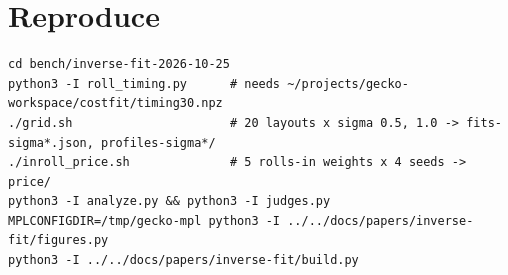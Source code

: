 \documentclass{gecko-paper}
\begin{document}
{\section{Reproduce}

\begin{verbatim}
cd bench/inverse-fit-2026-10-25
python3 -I roll_timing.py      # needs ~/projects/gecko-workspace/costfit/timing30.npz
./grid.sh                      # 20 layouts x sigma 0.5, 1.0 -> fits-sigma*.json, profiles-sigma*/
./inroll_price.sh              # 5 rolls-in weights x 4 seeds -> price/
python3 -I analyze.py && python3 -I judges.py
MPLCONFIGDIR=/tmp/gecko-mpl python3 -I ../../docs/papers/inverse-fit/figures.py
python3 -I ../../docs/papers/inverse-fit/build.py
\end{verbatim}

}
\end{document}
